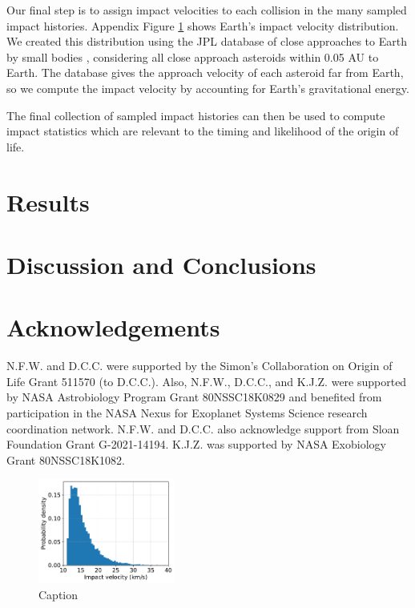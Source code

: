 \documentclass[preprint]{aastex63}
\begin{document}
Our final step is to assign impact velocities to each collision in the many sampled impact histories. Appendix Figure \ref{fig:velocity_distribution} shows Earth's impact velocity distribution. We created this distribution using the JPL database of close approaches to Earth by small bodies \citep{Park_2023}, considering all close approach asteroids within 0.05 AU to Earth. The database gives the approach velocity of each asteroid far from Earth, so we compute the impact velocity by accounting for Earth's gravitational energy.

The final collection of sampled impact histories can then be used to compute impact statistics which are relevant to the timing and likelihood of the origin of life.

\section{Results}



\section{Discussion and Conclusions}

\section*{Acknowledgements}

N.F.W. and D.C.C. were supported by the Simon's Collaboration on Origin of Life Grant 511570 (to D.C.C.). Also, N.F.W., D.C.C., and K.J.Z. were supported by NASA Astrobiology Program Grant 80NSSC18K0829 and benefited from participation in the NASA Nexus for Exoplanet Systems Science research coordination network. N.F.W. and D.C.C. also acknowledge support from Sloan Foundation Grant G-2021-14194. K.J.Z. was supported by NASA Exobiology Grant 80NSSC18K1082.

\appendix

\renewcommand{\thefigure}{A\arabic{figure}}
\renewcommand{\thetable}{A\arabic{table}}
\setcounter{figure}{0}
\setcounter{table}{0}

\begin{figure}
  \centering
  \includegraphics[width=0.4\textwidth]{figures/velocity_distribution.pdf}
  \caption{Caption}
  \label{fig:velocity_distribution}
\end{figure}




\end{document}
